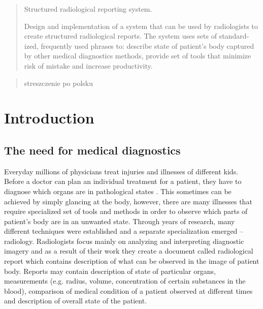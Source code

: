 \documentclass[12pt, twoside, openany]{report}
\theoremstyle{definition}
\begin{document}
\thispagestyle{empty}
\newpage
\pagestyle{headings}
\setcounter{page}{1}
\begin{otherlanguage}{british}
\begin{abstract}
Structured radiological reporting system.

Design and implementation of a system that can be used by radiologists to create structured radiological reports. The system uses sets of standardized, frequently used phrases to: describe state of patient's body captured by other medical diagnostics methods, provide set of tools that minimize risk of mistake and increase productivity. 
\end{abstract}
\end{otherlanguage}
\begin{otherlanguage}{polish}
\begin{abstract}
streszczenie po polsku
\end{abstract}
\end{otherlanguage}

\tableofcontents
\clearpage







\chapter{Introduction}
\section{The need for medical diagnostics}
Everyday millions of physicians treat injuries and illnesses of different kids. Before a doctor can plan an individual treatment for a patient, they have to diagnose which organs are in pathological states \cite{bls}. This sometimes can be achieved by simply glancing at the body, however, there are many illnesses that require specialized set of tools and methods in order to observe which parts of patient's body are in an unwanted state. Through years of research, many different techniques were established and a separate specialization emerged -- radiology. Radiologists focus mainly on analyzing and interpreting diagnostic imagery and as a result of their work they create a document called radiological report which contains description of what can be observed in the image of patient body. Reports may contain description of state of particular organs, measurements (e.g. radius, volume, concentration of certain substances in the blood), comparison of medical condition of a patient observed at different times and description of overall state of the patient. \\
\end{document}
